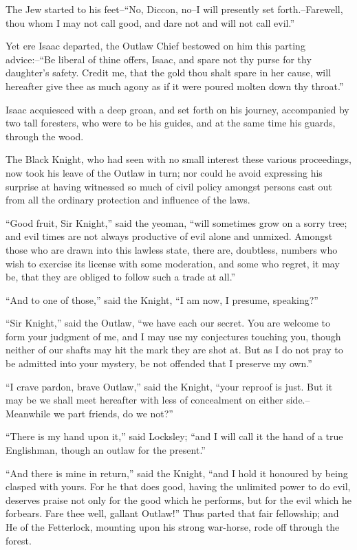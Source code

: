 The Jew started to his feet--``No, Diccon, no--I will presently set
forth.--Farewell, thou whom I may not call good, and dare not and will
not call evil.''

Yet ere Isaac departed, the Outlaw Chief bestowed on him this parting
advice:--``Be liberal of thine offers, Isaac, and spare not thy purse
for thy daughter's safety. Credit me, that the gold thou shalt spare in
her cause, will hereafter give thee as much agony as if it were poured
molten down thy throat.''

Isaac acquiesced with a deep groan, and set forth on his journey,
accompanied by two tall foresters, who were to be his guides, and at the
same time his guards, through the wood.

The Black Knight, who had seen with no small interest these various
proceedings, now took his leave of the Outlaw in turn; nor could he
avoid expressing his surprise at having witnessed so much of civil
policy amongst persons cast out from all the ordinary protection and
influence of the laws.

``Good fruit, Sir Knight,'' said the yeoman, ``will sometimes grow on a
sorry tree; and evil times are not always productive of evil alone and
unmixed. Amongst those who are drawn into this lawless state, there are,
doubtless, numbers who wish to exercise its license with some
moderation, and some who regret, it may be, that they are obliged to
follow such a trade at all.''

``And to one of those,'' said the Knight, ``I am now, I presume,
speaking?''

``Sir Knight,'' said the Outlaw, ``we have each our secret. You are
welcome to form your judgment of me, and I may use my conjectures
touching you, though neither of our shafts may hit the mark they are
shot at. But as I do not pray to be admitted into your mystery, be not
offended that I preserve my own.''

``I crave pardon, brave Outlaw,'' said the Knight, ``your reproof is
just. But it may be we shall meet hereafter with less of concealment on
either side.--Meanwhile we part friends, do we not?''

``There is my hand upon it,'' said Locksley; ``and I will call it the
hand of a true Englishman, though an outlaw for the present.''

``And there is mine in return,'' said the Knight, ``and I hold it
honoured by being clasped with yours. For he that does good, having the
unlimited power to do evil, deserves praise not only for the good which
he performs, but for the evil which he forbears. Fare thee well, gallant
Outlaw!'' Thus parted that fair fellowship; and He of the Fetterlock,
mounting upon his strong war-horse, rode off through the forest.
